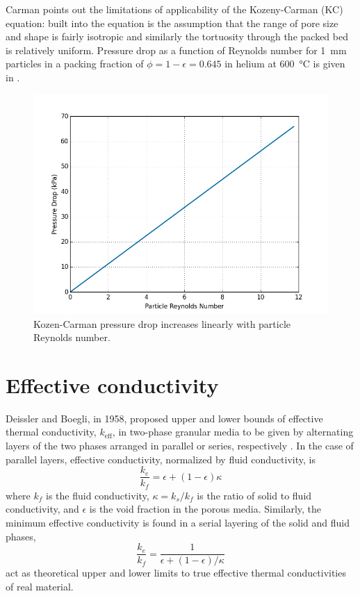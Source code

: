 \documentclass[11pt]{report} %
\begin{document}
Carman points out the limitations of applicability of the Kozeny-Carman (KC) equation: built into the equation is the assumption that the range of pore size and shape is fairly isotropic and similarly the tortuosity through the packed bed is relatively uniform. Pressure drop as a function of Reynolds number for \SI{1}{\milli\meter} particles in a packing fraction of $\phi = 1-\epsilon = 0.645$ in helium at \SI{600}{\celsius} is given in .

\begin{figure}[ht]
    \centering
    \includegraphics[width=\textwidth]{images/KC-pressure-drop}
    \caption{Kozen-Carman pressure drop increases linearly with particle Reynolds number.}
    \label{fig:KC-pressure-drop}
\end{figure}



\section{Effective conductivity}
Deissler and Boegli, in 1958, proposed upper and lower bounds of effective thermal conductivity, $k_\text{eff}$, in two-phase granular media to be given by alternating layers of the two phases arranged in parallel or series, respectively \cite{Deissler1958}. In the case of parallel layers, effective conductivity, normalized by fluid conductivity, is
\begin{equation}\label{eq:keff-parallel}
	\frac{k_e}{k_f} = \epsilon + (1-\epsilon)\kappa
\end{equation}
where $k_f$ is the fluid conductivity, $\kappa = k_s/k_f$ is the ratio of solid to fluid conductivity, and $\epsilon$ is the void fraction in the porous media. Similarly, the minimum effective conductivity is found in a serial layering of the solid and fluid phases,
\begin{equation}\label{eq:keff-series}
	\frac{k_e}{k_f} = \frac{1}{\epsilon + (1-\epsilon)/\kappa}
\end{equation}
 act as theoretical upper and lower limits to true effective thermal conductivities of real material.
\end{document}
